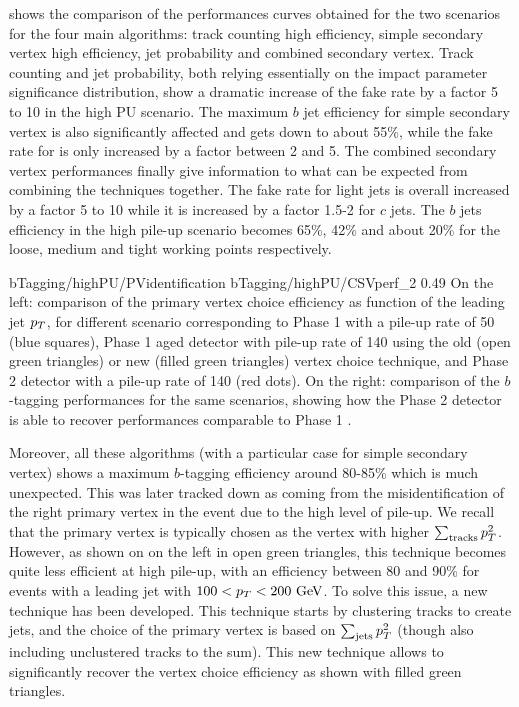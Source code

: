      shows the comparison of the performances curves
    obtained for the two scenarios for the four main algorithms: track counting high
    efficiency, simple secondary vertex high efficiency, jet probability and combined secondary vertex.
    Track counting and jet probability, both relying essentially on the impact parameter
    significance distribution, show a dramatic increase of the fake rate by a factor
    5 to 10 in the high PU scenario. The maximum $b$ jet efficiency for simple secondary
    vertex is also significantly affected and gets down to about 55\%, while the fake rate
    for is only increased by a factor between 2 and 5. The combined secondary vertex
    performances finally give information to what can be expected from combining the
    techniques together. The fake rate for light jets is overall increased by a factor 5
    to 10 while it is increased by a factor 1.5-2 for $c$ jets. The $b$ jets efficiency in
    the high pile-up scenario becomes 65\%, 42\% and about 20\% for the loose, medium and
    tight working points respectively.

                     {bTagging/highPU/PVidentification}
                     {bTagging/highPU/CSVperf_2}
                     {0.49}
                     {On the left: comparison of the primary vertex choice efficiency as function of the
                     leading jet $p_T$, for different scenario corresponding to Phase 1
                     with a pile-up rate of 50 (blue squares),
                     Phase 1 aged detector with pile-up rate of 140 using the old (open
                     green triangles) or new (filled green triangles) vertex choice
                     technique, and Phase 2 detector with a pile-up rate of 140 (red dots).
                     On the right: comparison of the $b$-tagging performances for the same
                     scenarios, showing how the Phase 2 detector is able to recover performances
                     comparable to Phase 1 \cite{Phase2TDR}.}

    Moreover, all these algorithms (with a particular case for simple secondary vertex)
    shows a maximum $b$-tagging efficiency around 80-85\% which is much unexpected. This
    was later \cite{Phase2TDR} tracked down as coming from the misidentification of the right primary vertex
    in the event due to the high level of pile-up. We recall that the primary vertex
    is typically chosen as the vertex with higher $\sum_\text{tracks} p_T^2$. However,
    as shown on  on the left in open green triangles, this
    technique becomes quite less efficient at high pile-up, with an efficiency between 80 and 90\%
    for events with a leading jet with $100 < p_T < 200 ~\text{GeV}$. To solve this issue, a new
    technique has been developed. This technique starts by clustering tracks to create jets,
    and the choice of the primary vertex is based on $\sum_\text{jets} p_T^2$ (though also
    including unclustered tracks to the sum). This new technique allows to significantly
    recover the vertex choice efficiency as shown with filled green triangles.


